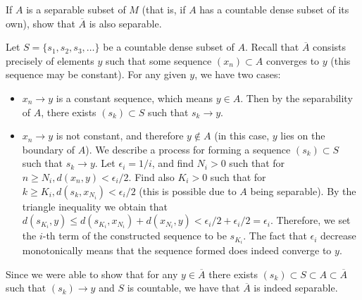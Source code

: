 \begin{exercise}{68}
    If $A$ is a separable subset of $M$ (that is, if $A$ has a countable dense subset of its own), show that $\overline{A}$ is also separable.
\end{exercise}

\begin{solution}
    
    Let $S = \{s_1, s_2, s_3, \ldots\}$ be a countable dense subset of $A$.
    Recall that $\overline{A}$ consists precisely of elements $y$ such that some sequence $(x_n) \subset A$ converges to $y$ (this sequence may be constant).
    For any given $y$, we have two cases:
    \begin{itemize}
        \item $x_n \rightarrow y$ is a constant sequence, which means $y \in A$.
        Then by the separability of $A$, there exists $(s_k) \subset S$ such that $s_k \rightarrow y$.
        \item $x_n \rightarrow y$ is not constant, and therefore $y \notin A$ (in this case, $y$ lies on the boundary of $A$).
        We describe a process for forming a sequence $(s_k) \subset S$ such that $s_k \rightarrow y$.
        Let $\epsilon_i = 1/i$, and find $N_i > 0$ such that for $n \geq N_i, d(x_n, y) < \epsilon_i/2$.
        Find also $K_i > 0$ such that for $k \geq K_i, d(s_{k}, x_{N_i}) < \epsilon_i/2$ (this is possible due to $A$ being separable).
        By the triangle inequality we obtain that $d(s_{K_i}, y) \leq d(s_{K_i}, x_{N_i}) + d(x_{N_i}, y) < \epsilon_i/2 + \epsilon_i/2 = \epsilon_i$.
        Therefore, we set the $i$-th term of the constructed sequence to be $s_{K_i}$.
        The fact that $\epsilon_i$ decrease monotonically means that the sequence formed does indeed converge to $y$.
    \end{itemize}
    Since we were able to show that for any $y \in \overline{A}$ there exists $(s_k) \subset S \subset A \subset \overline{A}$ such that $(s_k) \rightarrow y$ and $S$ is countable, we have that $\overline{A}$ is indeed separable.
\end{solution}
